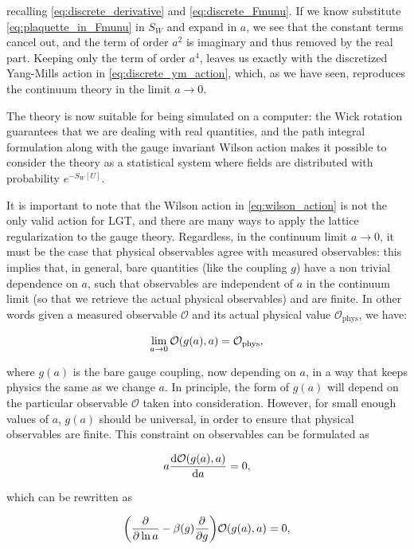 \documentclass[reqno,12pt]{article}
\numberwithin{equation}{section}
\begin{document}
recalling \eqref{eq:discrete_derivative} and \eqref{eq:discrete_Fmunu}. If we know substitute \eqref{eq:plaquette_in_Fmunu}
in $S_W$ and expand in $a$, we see that the constant terms cancel out, and the term of order $a^2$ is imaginary and thus removed by
the real part. Keeping only the term of order $a^4$, leaves us exactly with the discretized Yang-Mills action in 
\eqref{eq:discrete_ym_action}, which, as we have seen, reproduces the continuum theory in the limit $a \rightarrow 0$.

The theory is now suitable for being simulated on a computer: the Wick rotation guarantees that we are dealing with
real quantities, and the path integral formulation along with the gauge invariant Wilson action makes it possible
to consider the theory as a statistical system where fields are distributed with probability $e^{-S_W[U]}$.

It is important to note that the Wilson action in \eqref{eq:wilson_action} is not the only valid action for LGT, and
there are many ways to apply the lattice regularization to the gauge theory. Regardless, in the continuum limit
$a \rightarrow 0$, it must be the case that physical observables agree with measured observables: this implies that,
in general, bare quantities (like the coupling $g$) have a non trivial dependence on $a$, such that observables are 
independent of $a$ in the continuum limit (so that we retrieve the actual physical observables) and are finite. In other words
given a measured observable $\mathcal{O}$ and its actual physical value $\mathcal{O}_\text{phys}$, we have:

\begin{equation}
	\lim_{a \rightarrow 0} \mathcal{O}\qty(g(a), a) = \mathcal{O}_\text{phys},
\end{equation}

where $g(a)$ is the bare gauge coupling, now depending on $a$, in a way that keeps physics the same as we change $a$. In principle,
the form of $g(a)$ will depend on the particular observable $\mathcal{O}$ taken into consideration. However, for small enough values
of $a$, $g(a)$ should be universal, in order to ensure that physical observables are finite. This constraint on observables
can be formulated as

\begin{equation}
	a \dv{\mathcal{O}\qty(g(a), a)}{a} = 0,
\end{equation}

which can be rewritten as

\begin{equation} \label{eq:renormalization_group}
	\qty(\pdv{\ln a} - \beta(g)\pdv{g}) \mathcal{O}\qty(g(a), a) = 0,
\end{equation}
\end{document}
